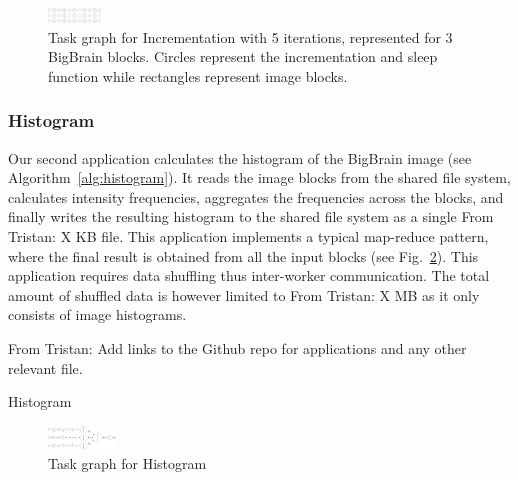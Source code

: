 \documentclass[conference]{IEEEtran}
\newcommand{\TG}[1]{\color{cyan}From Tristan: #1 \color{black}}
\begin{document}
\begin{figure}[!b]
    \centering
    \includegraphics[width=0.125\textwidth,
    angle=-90]{images/incrementation-task-graph.png}
    \caption{Task graph for Incrementation with 5 iterations, represented
    for 3 BigBrain blocks. Circles represent the incrementation and sleep
    function while rectangles represent image blocks.}\label{fig:tg-inc}
\end{figure}

\subsubsection{Histogram}

 Our second application calculates the histogram of the BigBrain image (see
 Algorithm~\ref{alg:histogram}). It reads the image blocks from the shared
 file system, calculates intensity frequencies, aggregates the frequencies
 across the blocks, and finally writes the resulting histogram to the
 shared file system as a single \TG{X}KB file. This application implements
 a typical map-reduce pattern, where the final result is obtained from all
 the input blocks (see Fig.~\ref{fig:tg-histo}). This application requires
 data shuffling thus inter-worker communication. The total amount of shuffled
 data is however limited to \TG{X}MB as it only consists of image
 histograms.

 \TG{Add links to the Github repo for applications and any other relevant file.}

\begin{algorithm}[!t]
    \caption{Histogram}\label{alg:histogram}
    \begin{algorithmic}
    \EndFor
    

    \end{algorithmic}
\end{algorithm}

\begin{figure}[!t]
    \centering
    \includegraphics[width=0.16\textwidth, angle=-90]{images/histogram-task-graph.png}
    \caption{Task graph for Histogram}\label{fig:tg-histo}
\end{figure}
\end{document}
